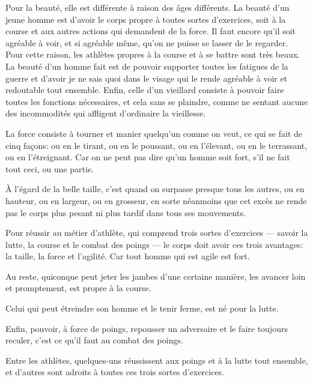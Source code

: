 Pour la beauté, elle est différente à raison des âges différents. La beauté d'un jeune homme est d'avoir le corps propre
à toutes sortes d'exercices, soit à la course et aux autres actions qui demandent de la force. Il faut encore qu'il soit
agréable à voir, et si agréable même, qu'on ne puisse se lasser de le regarder. Pour cette raison, les athlètes propres à
la course et à se battre sont très beaux. La beauté d'un homme fait est de pouvoir supporter toutes les fatigues de la guerre
et d'avoir je ne sais quoi dans le visage qui le rende agréable à voir et redoutable tout ensemble. Enfin, celle d'un
vieillard consiste à pouvoir faire toutes les fonctions nécessaires, et cela sans se plaindre, comme ne sentant aucune des
incommodités qui affligent d'ordinaire la vieillesse.

\bigbreak

La force consiste à tourner et manier quelqu'un comme on veut, ce qui se fait de cinq façons: ou en le tirant, ou en le
poussant, ou en l'élevant, ou en le terrassant, ou en l’étreignant. Car on ne peut pas dire qu'un homme soit fort, s'il
ne fait tout ceci, ou une partie.

\bigbreak

À l'égard de la belle taille, c'est quand on surpasse presque tous les autres, ou en hauteur, ou en largeur, ou en
grosseur, en sorte néanmoins que cet excès ne rende pas le corps plus pesant ni plus tardif dans tous ses mouvements.

\bigbreak

Pour réussir au métier d'athlète, qui comprend trois sortes d'exercices --- savoir la lutte, la course et le combat des poings
--- le corps doit avoir ces trois avantages: la taille, la force et l'agilité. Car tout homme qui est agile est fort.

Au reste, quiconque peut jeter les jambes d'une certaine manière, les avancer loin et promptement, est propre à la course.

Celui qui peut étreindre son homme et le tenir ferme, est né pour la lutte.

Enfin, pouvoir, à force de poings, repousser un adversaire et le faire toujours reculer, c'est ce qu'il faut au combat des
poings.

Entre les athlètes, quelques-uns réussissent aux poings et à la lutte tout ensemble, et d'autres sont adroits à toutes ces
trois sortes d'exercices.

\bigbreak


